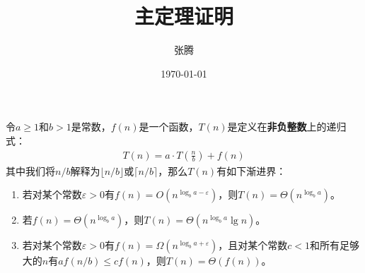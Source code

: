 \documentclass{ctexart}
\begin{document}
\title{\textbf{主定理证明}}
\author{张腾}
\date{\today}
\maketitle

\begin{theorem} [主定理]
    令$a \ge 1$和$b > 1$是常数，$f(n)$是一个函数，$T(n)$是定义在\textbf{非负整数}上的递归式：
    \begin{align*}
        T(n) = a \cdot T \left( \frac{n}{b} \right) + f(n)
    \end{align*}
    其中我们将$n/b$解释为$\lfloor n/b \rfloor$或$\lceil n/b \rceil$，那么$T(n)$有如下渐进界：
    \begin{enumerate}
        \item 若对某个常数$\varepsilon > 0$有$f(n) = O(n^{\log_b a - \varepsilon})$，则$T(n) = \Theta (n^{\log_b a})$。
        \item 若$f(n) = \Theta (n^{\log_b a})$，则$T(n) = \Theta (n^{\log_b a} \lg n)$。
        \item 若对某个常数$\varepsilon > 0$有$f(n) = \Omega(n^{\log_b a + \varepsilon})$，且对某个常数$c<1$和所有足够大的$n$有$a f(n/b) \le c f(n)$，则$T(n) = \Theta (f(n))$。
    \end{enumerate}
\end{theorem}
\end{document}
